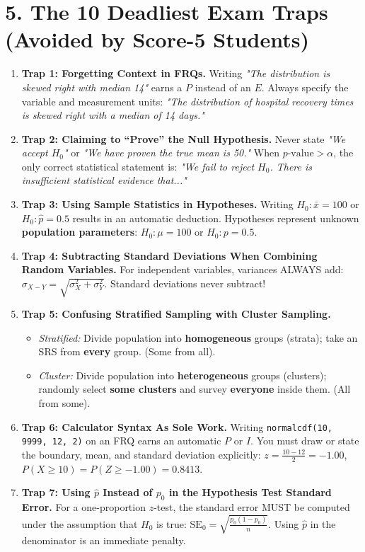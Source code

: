 \section*{5. The 10 Deadliest Exam Traps (Avoided by Score-5 Students)}
\begin{enumerate}[leftmargin=1.5em]
  \item \textbf{Trap 1: Forgetting Context in FRQs.} Writing \textit{"The distribution is skewed right with median 14"} earns a $P$ instead of an $E$. Always specify the variable and measurement units: \textit{"The distribution of hospital recovery times is skewed right with a median of 14 days."}
  \item \textbf{Trap 2: Claiming to ``Prove'' the Null Hypothesis.} Never state \textit{"We accept $H_0$"} or \textit{"We have proven the true mean is 50."} When $p\text{-value} > \alpha$, the only correct statistical statement is: \textit{"We fail to reject $H_0$. There is insufficient statistical evidence that..."}
  \item \textbf{Trap 3: Using Sample Statistics in Hypotheses.} Writing $H_0: \bar{x} = 100$ or $H_0: \hat{p} = 0.5$ results in an automatic deduction. Hypotheses represent unknown \textbf{population parameters}: $H_0: \mu = 100$ or $H_0: p = 0.5$.
  \item \textbf{Trap 4: Subtracting Standard Deviations When Combining Random Variables.} For independent variables, variances ALWAYS add: $\sigma_{X - Y} = \sqrt{\sigma_X^2 + \sigma_Y^2}$. Standard deviations never subtract!
  \item \textbf{Trap 5: Confusing Stratified Sampling with Cluster Sampling.}
  \begin{itemize}
    \item \textit{Stratified:} Divide population into \textbf{homogeneous} groups (strata); take an SRS from \textbf{every} group. (Some from all).
    \item \textit{Cluster:} Divide population into \textbf{heterogeneous} groups (clusters); randomly select \textbf{some clusters} and survey \textbf{everyone} inside them. (All from some).
  \end{itemize}
  \item \textbf{Trap 6: Calculator Syntax As Sole Work.} Writing \texttt{normalcdf(10, 9999, 12, 2)} on an FRQ earns an automatic $P$ or $I$. You must draw or state the boundary, mean, and standard deviation explicitly: $z = \frac{10 - 12}{2} = -1.00$, $P(X \ge 10) = P(Z \ge -1.00) = 0.8413$.
  \item \textbf{Trap 7: Using $\hat{p}$ Instead of $p_0$ in the Hypothesis Test Standard Error.} For a one-proportion $z$-test, the standard error MUST be computed under the assumption that $H_0$ is true: $\text{SE}_0 = \sqrt{\frac{p_0(1 - p_0)}{n}}$. Using $\hat{p}$ in the denominator is an immediate penalty.

\end{enumerate}
